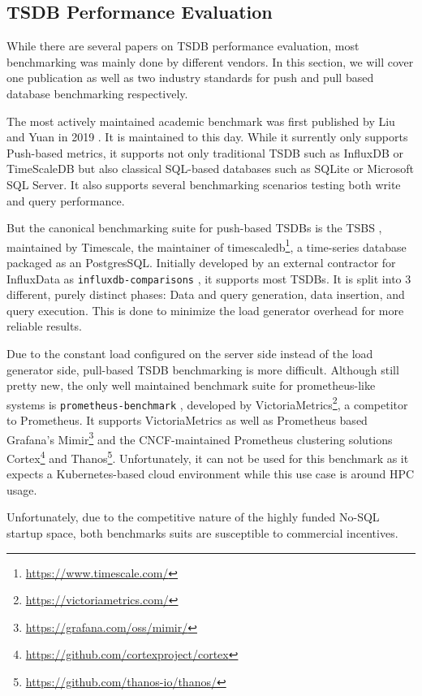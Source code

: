 \subsection{TSDB Performance Evaluation}
While there are several papers on \ac{TSDB} performance evaluation, most benchmarking was mainly
done by different vendors. In this section, we will cover one publication as well as two
industry standards for push and pull based database benchmarking respectively.

The most actively maintained academic benchmark was first published by Liu and Yuan in 2019 \cite{benchmark_paper}.
It is maintained to this day. While it surrently only supports Push-based metrics, it supports not
only traditional \ac{TSDB} such as InfluxDB or TimeScaleDB but also classical SQL-based databases
such as SQLite or Microsoft SQL Server. It also supports several benchmarking scenarios testing
both write and query performance.

But the canonical benchmarking suite for push-based \acp{TSDB} is the \ac{TSBS} \cite{tsbs}, 
maintained by Timescale, the maintainer of timescaledb\footnote{\url{https://www.timescale.com/}}, a 
time-series database packaged as an PostgresSQL. Initially developed by an external contractor
for InfluxData as \texttt{influxdb-comparisons} \cite{influxcomp}, it supports most \acp{TSDB}.
It is split into 3 different, purely distinct phases: Data and query generation, data insertion,
and query execution. This is done to minimize the load generator overhead for more reliable results.

Due to the constant load configured on the server side instead of the load generator side, pull-based
\ac{TSDB} benchmarking is more difficult. Although still pretty new, the only well maintained
benchmark suite for prometheus-like systems is \texttt{prometheus-benchmark} \cite{prombench}, developed by 
VictoriaMetrics\footnote{\url{https://victoriametrics.com/}}, a competitor to Prometheus. It supports
VictoriaMetrics as well as Prometheus based Grafana's Mimir\footnote{\url{https://grafana.com/oss/mimir/}}
and the \ac{CNCF}-maintained Prometheus clustering solutions Cortex\footnote{\url{https://github.com/cortexproject/cortex}}
and Thanos\footnote{\url{https://github.com/thanos-io/thanos/}}. Unfortunately, it can not be used for
this benchmark as it expects a Kubernetes-based cloud environment while this use case is around \ac{HPC} usage.

Unfortunately, due to the competitive nature of the highly funded No-SQL startup space, both
benchmarks suits are susceptible to commercial incentives.


